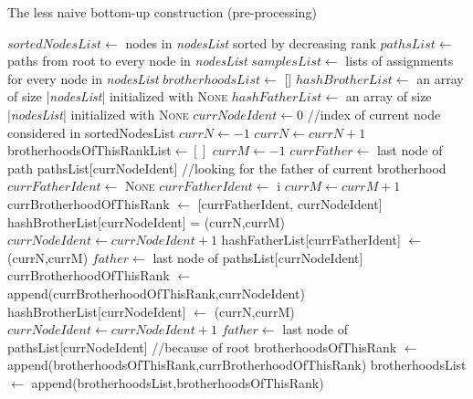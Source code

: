 \documentclass{report}
\begin{document}
\begin{algorithm}
\caption{The less naive bottom-up construction (pre-processing)}
\begin{algorithmic}
\STATE $sortedNodesList \leftarrow$ nodes in \emph{nodesList} sorted by decreasing rank
\STATE $pathsList \leftarrow$ paths from root to every node in \emph{nodesList}
\STATE $samplesList \leftarrow$ lists of assignments for every node in \emph{nodesList}
\STATE $brotherhoodsList \leftarrow$ []
\STATE $hashBrotherList \leftarrow$ an array of size |\emph{nodesList}| initialized with \textsc{None}
\STATE $hashFatherList \leftarrow$ an array of size |\emph{nodesList}| initialized with \textsc{None}
\STATE $currNodeIdent \leftarrow 0$ //index of current node considered in sortedNodesList
\STATE $currN \leftarrow -1$
\STATE $currN \leftarrow currN + 1$
\STATE brotherhoodsOfThisRankList$ \leftarrow []$
\STATE $currM \leftarrow -1$
\STATE $currFather \leftarrow$ last node of path pathsList[currNodeIdent] //looking for the father of current brotherhood
\STATE $currFatherIdent \leftarrow$ \textsc{None}
\STATE $currFatherIdent \leftarrow$ i
\ENDIF
\ENDFOR
\STATE $currM \leftarrow currM + 1$
\STATE currBrotherhoodOfThisRank $\leftarrow$ [currFatherIdent, currNodeIdent] 
\STATE hashBrotherList[currNodeIdent] = (currN,currM)
\STATE $currNodeIdent \leftarrow currNodeIdent + 1$
\STATE hashFatherList[currFatherIdent] $\leftarrow$ (currN,currM)
\STATE $father \leftarrow $ last node of pathsList[currNodeIdent]
\ENDIF
{}
\STATE currBrotherhoodOfThisRank $\leftarrow$ append(currBrotherhoodOfThisRank,\-currNodeIdent)
\STATE hashBrotherList[currNodeIdent] $\leftarrow$ (currN,currM)
\ENDIF
\STATE $currNodeIdent \leftarrow currNodeIdent + 1$
\STATE $father \leftarrow $ last node of pathsList[currNodeIdent] //because of root
\ENDIF
\STATE brotherhoodsOfThisRank $\leftarrow$ append(brotherhoodsOfThisRank,\-currBrotherhoodOfThisRank)
\ENDWHILE
{}
\STATE brotherhoodsList $\leftarrow$ append(brotherhoodsList,brotherhoodsOfThisRank)
\ENDIF
\ENDWHILE
\ENDFOR
{}
\end{algorithmic}
\end{algorithm}
\end{document}
